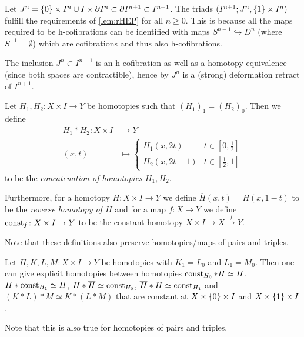 \begin{remark}\label{rmk:cwInclIsHCofib}
    Let $J^n=\left\lbrace0\right\rbrace\times I^n\cup I\times\partial I^n\subset\partial I^{n+1}\subset I^{n+1}$.
    The triads $(I^{n+1};J^n,\left\lbrace1\right\rbrace\times I^n)$ fulfill the requirements of \cref{lem:rHEP} for all $n\geq 0$.
    This is because all the maps required to be h-cofibrations can be identified with maps $S^{n-1}\hookrightarrow D^n$ (where $S^{-1}=\emptyset$) which are cofibrations and thus also h-cofibrations.
    
    The inclusion $J^n\subset I^{n+1}$ is an h-cofibration as well as a homotopy equivalence (since both spaces are contractible), hence by \cite[Corollary 0.20]{hatcher2002algebraic} $J^n$ is a (strong) deformation retract of $I^{n+1}$.
\end{remark}
\begin{definition}
    Let $H_1,H_2\colon X\times I\to Y$ be homotopies such that $(H_1)_1=(H_2)_0$.
    Then we define 
    \begin{align*}
        H_1*H_2\colon X\times I&\to Y\\
        (x,t)&\mapsto\begin{cases}
            H_1(x,2t) & t\in[0,\frac{1}{2}]\\
            H_2(x,2t-1) & t\in[\frac{1}{2},1]
        \end{cases}
    \end{align*}
    to be the \emph{concatenation of homotopies $H_1, H_2$}.

    Furthermore, for a homotopy $H\colon X\times I\to Y$ we define $\overline{H}(x,t)=H(x,1-t)$ to be the \emph{reverse homotopy of $H$} and for a map $f\colon X\to Y$ we define $\operatorname{const}_f\colon X\times I\to Y$ to be the constant homotopy $X\times I\to X\xrightarrow{f}Y$.
    
    Note that these definitions also preserve homotopies/maps of pairs and triples.
\end{definition}
\begin{remark}\label{rmk:choiceOfConstantHtpy}
    Let $H,K,L,M\colon X\times I\to Y$ be homotopies with $K_1=L_0$ and $L_1=M_0$.
    Then one can give explicit homotopies between homotopies $\operatorname{const}_{H_0}*H\simeq H$, $H*\operatorname{const}_{H_1}\simeq H$, $H*\overline{H}\simeq \operatorname{const}_{H_0}$, $\overline{H}*H\simeq\operatorname{const}_{H_1}$ and $(K*L)*M\simeq K*(L*M)$ that are constant at $X\times\left\lbrace0\right\rbrace\times I$ and $X\times\left\lbrace1\right\rbrace\times I$.

    Note that this is also true for homotopies of pairs and triples.
\end{remark}
